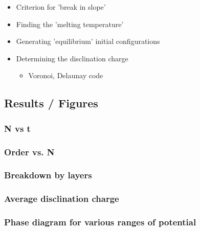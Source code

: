 \documentclass[11pt]{article}
\begin{document}
\begin{itemize}

\item Criterion for 'break in slope'\\
\label{sec-3.2.3.1}


\item Finding the 'melting temperature'\\
\label{sec-3.2.3.2}


\item Generating 'equilibrium' initial configurations\\
\label{sec-3.2.3.3}


\item Determining the disclination charge\\
\label{sec-3.2.3.4}

\begin{itemize}

\item Voronoi, Delaunay code\\
\label{sec-3.2.3.4.1}

\end{itemize} %
\end{itemize} %
\subsection{Results / Figures}
\label{sec-3.3}

\subsubsection{N vs t}
\label{sec-3.3.1}

\subsubsection{Order vs. N}
\label{sec-3.3.2}

\subsubsection{Breakdown by layers}
\label{sec-3.3.3}

\subsubsection{Average disclination charge}
\label{sec-3.3.4}

\subsubsection{Phase diagram for various ranges of potential}
\label{sec-3.3.5}
\end{document}
